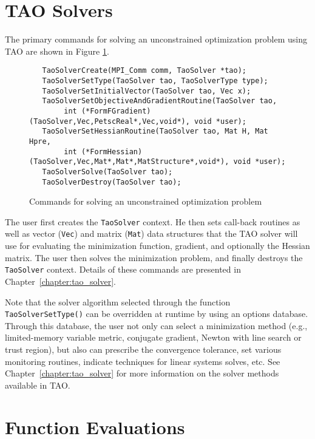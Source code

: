 \section{TAO Solvers}

The primary commands for solving an unconstrained optimization problem
using TAO are shown in Figure \ref{fig:tao_commands}.
 
 
 

\begin{figure}[H]
\begin{verbatim}
   TaoSolverCreate(MPI_Comm comm, TaoSolver *tao); 
   TaoSolverSetType(TaoSolver tao, TaoSolverType type);
   TaoSolverSetInitialVector(TaoSolver tao, Vec x);
   TaoSolverSetObjectiveAndGradientRoutine(TaoSolver tao, 
        int (*FormFGradient)(TaoSolver,Vec,PetscReal*,Vec,void*), void *user);
   TaoSolverSetHessianRoutine(TaoSolver tao, Mat H, Mat Hpre,
        int (*FormHessian)(TaoSolver,Vec,Mat*,Mat*,MatStructure*,void*), void *user);
   TaoSolverSolve(TaoSolver tao);
   TaoSolverDestroy(TaoSolver tao);
\end{verbatim}
\caption{Commands for solving an unconstrained optimization problem
\label{fig:tao_commands}}
\end{figure}

\noindent
The user first creates the \texttt{TaoSolver} context. 
He then sets call-back routines as
well as vector (\texttt{Vec}) and matrix (\texttt{Mat}) data
structures that the TAO solver will use for evaluating the
minimization function, gradient, and optionally the Hessian matrix.
The user then solves the minimization problem, and finally destroys
the \texttt{TaoSolver} context.
Details of these commands are presented in
Chapter~\ref{chapter:tao_solver}.

Note that the solver algorithm selected through the function 
\texttt{TaoSolverSetType()} can be overridden
at runtime by using an options database.  Through this
database, the user not only can select a minimization method (e.g.,
limited-memory variable metric, conjugate gradient, Newton with line
search or trust region), but also can prescribe the convergence
tolerance, set various monitoring routines, indicate techniques for
linear systems solves, etc.  See Chapter~\ref{chapter:tao_solver} for more 
information on the solver methods available in TAO.

\section{Function Evaluations}

